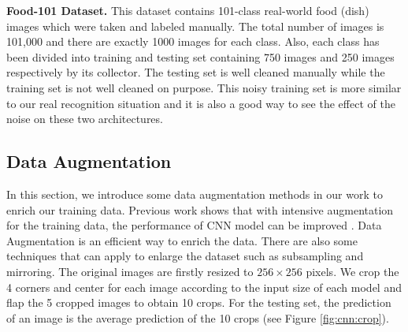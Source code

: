 \textbf{Food-101 Dataset.}
This dataset contains 101-class real-world food (dish) images which were taken and labeled manually. The total number of images is 101,000 and there are exactly 1000 images for each class. Also, each class has been divided into training and testing set containing 750 images and 250 images respectively by its collector. The testing set is well cleaned manually while the training set is not well cleaned on purpose. This noisy training set is more similar to our real recognition situation and it is also a good way to see the effect of the noise on these two architectures.

\subsection{Data Augmentation}
In this section, we introduce some data augmentation methods in our work to enrich our training data. Previous work shows that with intensive augmentation for the training data, the performance of CNN model can be improved \cite{wu2015deep}. 
Data Augmentation is an efficient way to enrich the data. There are also some techniques that can apply to enlarge the dataset such as subsampling and mirroring. The original images are firstly resized to $256\times 256$ pixels. We crop the 4 corners and center for each image according to the input size of each model and flap the 5 cropped images to obtain 10 crops. For the testing set, the prediction of an image is the average prediction of the 10 crops (see Figure \ref{fig:cnn:crop}).

